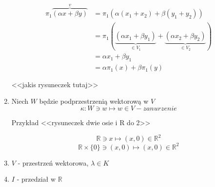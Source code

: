 \documentclass[a5paper,8pt]{article}
\newtheorem{example}{Przykład}[section]
\newcommand\tab[1][1cm]{\hspace*{#1}}
\begin{document}
\begin{enumerate}
            \begin{equation*}
                \begin{aligned}
                    \pi_1 \overbrace{(\alpha x + \beta y)}^{v} &= \pi_1 ( \alpha(x_1 + x_2) + \beta(y_1 + y_2))\\
                    & = \pi_1( \underbrace{( \alpha x_1 + \beta y_1 )}_{\in V_1}
                        + \underbrace{( \alpha x_2 + \beta y_2 )}_{\in V_2})\\
                    & = \alpha x_1 + \beta y_1 \\
                    & = \alpha \pi_1(x) + \beta \pi_1(y)
                \end{aligned}
            \end{equation*}

            <<jakis rysuneczek tutaj>>
        \item
            Niech $W$ będzie podprzestrzenią wektorową w $V$\\
            \begin{equation*}
                \kappa: W \ni w \longmapsto w \in V - zanurzenie
            \end{equation*}

            Przykład <<rysuneczek dwie osie i R do 2>>

            \begin{equation*}
                \mathbb{R} \ni x \longmapsto (x,0) \in \mathbb{R}^2
            \end{equation*}
            \begin{equation*}
                \mathbb{R} \times \{0\} \ni (x,0) \longmapsto (x,0) \in \mathbb{R}^2
            \end{equation*}
        \item
            $ V $ - przestrzeń wektorowa, $ \lambda \in K $
        \item
            $ I $ - przedział w $ \mathbb{R} $
    \end{enumerate}

\end{document}
